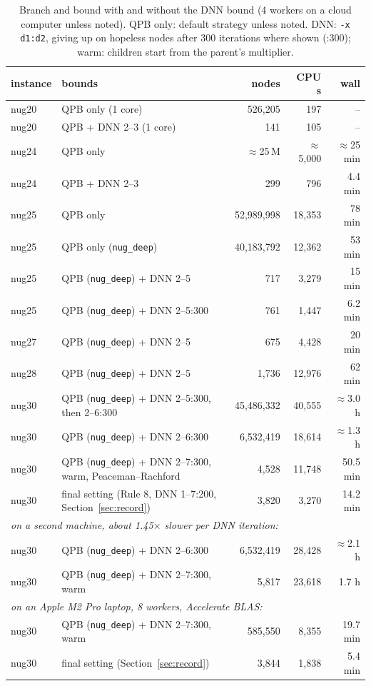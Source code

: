 \documentclass[10pt]{article}
\theoremstyle{remark}
\newcommand{\CleanNodes}{6,532,419}
\newcommand{\CleanCPU}{18,614}
\newcommand{\CleanWall}{$\approx$1.3 h}
\begin{document}
\begin{table}[t]\centering
\caption{Branch and bound with and without the DNN bound (4 workers on a cloud
computer unless noted).
QPB only: default strategy unless noted. DNN: \texttt{-x d1:d2}, giving up on
hopeless nodes after 300 iterations where shown (:300); warm: children start from
the parent's multiplier.}\label{tab:bnb}
\small\setlength{\tabcolsep}{4pt}
\begin{tabular}{l>{\raggedright\arraybackslash}p{4.6cm}rrr}
\toprule
instance & bounds & nodes & CPU s & wall\\
\midrule
nug20 & QPB only (1 core) & 526,205 & 197 & --\\
nug20 & QPB + DNN 2--3 (1 core) & 141 & 105 & --\\
nug24 & QPB only & $\approx$25\,M & $\approx$5,000 & $\approx$25 min\\
nug24 & QPB + DNN 2--3 & 299 & 796 & 4.4 min\\
nug25 & QPB only & 52,989,998 & 18,353 & 78 min\\
nug25 & QPB only (\texttt{nug\_deep}) & 40,183,792 & 12,362 & 53 min\\
nug25 & QPB (\texttt{nug\_deep}) + DNN 2--5 & 717 & 3,279 & 15 min\\
nug25 & QPB (\texttt{nug\_deep}) + DNN 2--5:300 & 761 & 1,447 & 6.2 min\\
nug27 & QPB (\texttt{nug\_deep}) + DNN 2--5 & 675 & 4,428 & 20 min\\
nug28 & QPB (\texttt{nug\_deep}) + DNN 2--5 & 1,736 & 12,976 & 62 min\\
nug30 & QPB (\texttt{nug\_deep}) + DNN 2--5:300, then 2--6:300 & 45,486,332 & 40,555 & $\approx$3.0 h\\
nug30 & QPB (\texttt{nug\_deep}) + DNN 2--6:300 & \CleanNodes & \CleanCPU & \CleanWall\\
nug30 & QPB (\texttt{nug\_deep}) + DNN 2--7:300, warm, Peaceman--Rachford & 4,528 & 11,748 & 50.5 min\\
nug30 & final setting (Rule 8, DNN 1--7:200, Section~\ref{sec:record}) & 3,820 & 3,270 & 14.2 min\\
\midrule
\multicolumn{5}{l}{\emph{on a second machine, about 1.45$\times$ slower per DNN iteration:}}\\
nug30 & QPB (\texttt{nug\_deep}) + DNN 2--6:300 & 6,532,419 & 28,428 & $\approx$2.1 h\\
nug30 & QPB (\texttt{nug\_deep}) + DNN 2--7:300, warm & 5,817 & 23,618 & 1.7 h\\
\midrule
\multicolumn{5}{l}{\emph{on an Apple M2 Pro laptop, 8 workers, Accelerate BLAS:}}\\
nug30 & QPB (\texttt{nug\_deep}) + DNN 2--7:300, warm & 585,550 & 8,355 & 19.7 min\\
nug30 & final setting (Section~\ref{sec:record}) & 3,844 & 1,838 & 5.4 min\\
\bottomrule
\end{tabular}
\end{table}
\end{document}
